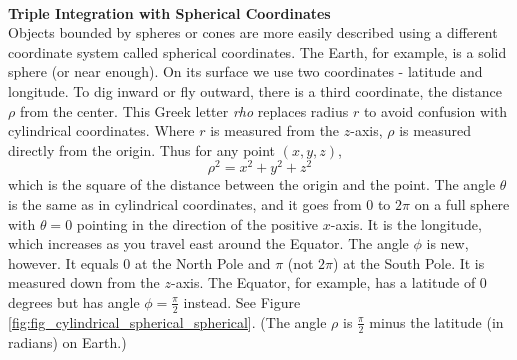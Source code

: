 \\


\noindent\textbf{\large Triple Integration with Spherical Coordinates}\\

Objects bounded by spheres or cones are more easily described using a different coordinate system called spherical coordinates.  The Earth, for example, is a solid sphere (or near enough). On its surface we use two coordinates - latitude and longitude. To dig inward or fly outward, there is a third coordinate, the distance $\rho$ from the center. This Greek letter \textit{rho} replaces radius $r$ to avoid confusion with cylindrical coordinates. Where $r$ is measured from the $z$-axis, $\rho$ is measured directly from the origin. Thus for any point $(x,y,z)$,
$$\rho^2 = x^2 + y^2 + z^2$$
which is the square of the distance between the origin and the point. The angle $\theta$ is the same as in cylindrical coordinates, and it goes from $0$ to $2\pi$ on a full sphere with $\theta = 0$ pointing in the direction of the positive $x$-axis. It is the longitude, which increases as you travel east around the Equator. The angle $\phi$ is new, however. It equals $0$ at the North Pole and $\pi$ (not $2\pi$) at the South Pole. It is measured down from the $z$-axis. The Equator, for example, has a latitude of $0$ degrees but has angle $\phi = \frac{\pi}{2}$ instead. See Figure \ref{fig:fig_cylindrical_spherical_spherical}.  (The angle $\rho$ is $\frac{\pi}{2}$ minus the latitude (in radians) on Earth.)

